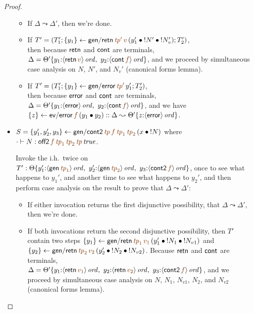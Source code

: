 \begin{proof}
\begin{itemize}
\begin{itemize}
\item If $\Delta \leadsto \Delta'$, then we're done. 
\item If $T' = \left(T_1'; \trstep{y_1}{{\sf gen/retn}\,\lf{{\it tp}'}\,\lf{v}\,(\tfuser{y_1'}{\tfuser{\tbangr{N'}}{\tbangr{N_v'}}})}; T_2'\right)$,
\\
then because ${\sf retn}$ and ${\sf cont}$ are 
terminals, $\Delta = \tackon{\Theta'}{
         y_1{:}\istrue{\susp{{\sf retn}\,\lf{v}}}, ~
         y_2{:}\istrue{\susp{{\sf cont}\,\lf{f}}}}$, and we 
proceed by
simultaneous case analysis on $N$, $N'$, and $N_v'$ (canonical forms lemma). 
\item If $T' = \left(T_1'; \trstep{y_1}{{\sf gen/error}\,\lf{{\it tp}'}\,y_1'}; T_2'\right)$,
\\
then because ${\sf error}$ and ${\sf cont}$ are terminals,
$\Delta = \tackon{\Theta'}{
         y_1{:}\istrue{\susp{{\sf error}}}, ~
         y_2{:}\istrue{\susp{{\sf cont}\,\lf{f}}}}$, and we have
$\trstep{z}{{\sf ev/error}\,\lf{f}\,(\tfuser{y_1}{y_2})} :: \Delta \leadsto \tackon{\Theta'}{z{:}\istrue{\susp{{\sf error}}}}$.

\end{itemize}

\medskip
\item $S = \trstep{y_1', y_2', y_3}{{\sf gen/cont2}\,\lf{{\it tp}}\,\lf{f}\,\lf{{\it tp}_1}\,\lf{{\it tp}_2}\,(\tfuser{x}{\tbangr{N}})}$
where $\cdot \vdash N : \isconc{{\sf off2}\,\lf{f}\,\lf{{\it tp}_1}\, \lf{{\it tp}_2}\,\lf{{\it tp}}}$.


Invoke the i.h.~twice on $T' :
\tackon{\Theta}{y_1'{:}\istrue{\susp{{\sf gen}\,\lf{{\it tp}_1}}}, ~
  y_2'{:}\istrue{\susp{{\sf gen}\,\lf{{\it tp}_2}}}, ~
  y_3{:}\istrue{\susp{{\sf cont2}\,\lf{f}}}}$, once to see what happens
to $y_1'$, and another time to see what happens to $y_2'$,
and then perform case analysis on the result to prove that
$\Delta \leadsto \Delta'$:

\begin{itemize}
\item If either invocation returns the first disjunctive possibility,
  that $\Delta \leadsto \Delta'$, then we're done.

\item
If both invocations return the second disjunctive possibility, then
 $T'$ contain two steps
$\trstep{y_1}{{\sf gen/retn}\,\lf{{\it tp}_1}\,\lf{v_1}\,(\tfuser{y_1'}{\tfuser{\tbangr{N_1}}{\tbangr{N_{v1}}}})}$ and \\
$\trstep{y_2}{{\sf gen/retn}\,\lf{{\it tp}_2}\,\lf{v_2}\,(\tfuser{y_2'}{\tfuser{\tbangr{N_2}}{\tbangr{N_{v2}}}})}$. Because ${\sf retn}$ and ${\sf cont}$
are terminals, \\$\Delta = \tackon{\Theta'}{y_1{:}\istrue{\susp{{\sf retn}\,\lf{v_1}}}, ~ y_2{:}\istrue{\susp{{\sf retn}\,\lf{v_2}}}, ~ y_3{:}\istrue{\susp{{\sf cont2}\,\lf{f}}}}$, and we proceed
by simultaneous case analysis on $N$, $N_1$, $N_{v1}$, $N_2$, and $N_{v2}$
(canonical forms lemma). 


\end{itemize}
\end{itemize}
\end{proof}
